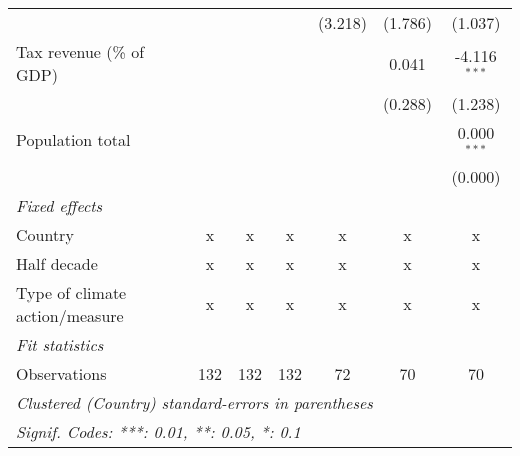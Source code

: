 \begin{tabular}{lcccccc}
                                                              &         &         &         & (3.218)      & (1.786)         & (1.037)\\   
   Tax revenue (\% of GDP)                                    &         &         &         &              & 0.041           & -4.116$^{***}$\\   
                                                              &         &         &         &              & (0.288)         & (1.238)\\   
   Population total                                           &         &         &         &              &                 & 0.000$^{***}$\\   
                                                              &         &         &         &              &                 & (0.000)\\   
   \emph{Fixed effects}\\
   Country                                                    & x       & x       & x       & x            & x               & x\\  
   Half decade                                                & x       & x       & x       & x            & x               & x\\  
   Type of climate action/measure                             & x       & x       & x       & x            & x               & x\\  
   \midrule \emph{Fit statistics}\\
   Observations                                               & 132     & 132     & 132     & 72           & 70              & 70\\  
   \midrule
   \multicolumn{7}{l}{\emph{Clustered (Country) standard-errors in parentheses}}\\
   \multicolumn{7}{l}{\emph{Signif. Codes: ***: 0.01, **: 0.05, *: 0.1}}\\
\end{tabular}
\par\endgroup


